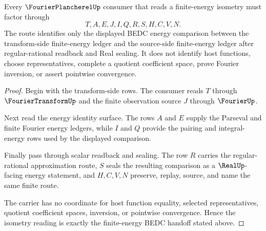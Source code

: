 \begin{theorem}
\label{thm:fourier-plancherel-finite-energy-isometry}
Every $\FourierPlancherelUp$ consumer that reads a finite-energy isometry must factor through
$$
T,A,E,J,I,Q,R,S,H,C,V,N .
$$
The route identifies only the displayed BEDC energy comparison between the transform-side finite-energy ledger and the source-side finite-energy ledger after regular-rational readback and Real sealing. It does not identify host functions, choose representatives, complete a quotient coefficient space, prove Fourier inversion, or assert pointwise convergence.
\end{theorem}
\begin{proof}
Begin with the transform-side rows. The consumer reads $T$ through $\FourierTransformUp$ and the finite observation source $J$ through $\FourierUp$.

Next read the energy identity surface. The rows $A$ and $E$ supply the Parseval and finite Fourier energy ledgers, while $I$ and $Q$ provide the pairing and integral-energy rows used by the displayed comparison.

Finally pass through scalar readback and sealing. The row $R$ carries the regular-rational approximation route, $S$ seals the resulting comparison as a $\RealUp$-facing energy statement, and $H,C,V,N$ preserve, replay, source, and name the same finite route.

The carrier has no coordinate for host function equality, selected representatives, quotient coefficient spaces, inversion, or pointwise convergence. Hence the isometry reading is exactly the finite-energy BEDC handoff stated above.
\end{proof}

\begin{closurestatus}{\FourierPlancherelUp}
  \theoryclosure{\seedClosure}
  \formalstatus{\unformalizedV}
\end{closurestatus}
